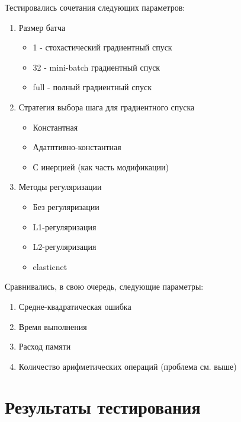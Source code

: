 \documentclass{article}
\begin{document}
Тестировались сочетания следующих параметров:
\begin{enumerate}
    \item Размер батча
    \begin{itemize}
        \item 1 - стохастический градиентный спуск
        \item 32 - mini-batch градиентный спуск
        \item full - полный градиентный спуск
    \end{itemize}
    \item Стратегия выбора шага для градиентного спуска
    \begin{itemize}
        \item 
        Константная 
        \item 
        Адатптивно-константная
        \item 
        С инерцией (как часть модификации)
    \end{itemize}
    \item Методы регуляризации
    \begin{itemize}
        \item 
        Без регуляризации
        \item 
        L1-регуляризация
        \item 
        L2-регуляризация
        \item 
        elasticnet
    \end{itemize}
\end{enumerate}
Сравнивались, в свою очередь, следующие параметры:
\begin{enumerate}
    \item 
    Средне-квадратическая ошибка
    \item
    Время выполнения
    \item 
    Расход памяти
    \item 
    Количество арифметических операций (проблема см. выше)
\end{enumerate}

\section{Результаты тестирования}
\end{document}
